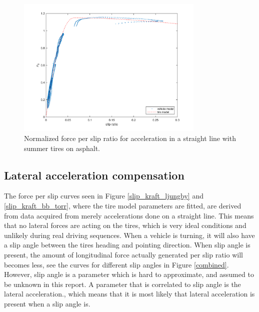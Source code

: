 \begin{figure}[h]
	\centering
	\includegraphics[width=0.8\textwidth]{Pictures/slip_kraft_lk_sport}
	\caption {Normalized force per slip ratio for acceleration in a straight line with summer tires on asphalt.}
	\label{slip_kraft_lk_sport}
\end{figure}

\subsection{Lateral acceleration compensation}
\label{sec:latacccomp}
The force per slip curves seen in Figure \ref{slip_kraft_ljungby} and \ref{slip_kraft_bb_torr}, where the tire model parameters are fitted, are derived from data acquired from merely accelerations done on a straight line. This means that no lateral forces are acting on the tires, which is very ideal conditions and unlikely during real driving sequences. When a vehicle is turning, it will also have a slip angle between the tires heading and pointing direction. When slip angle is present, the amount of longitudinal force actually generated per slip ratio will becomes less, see the curves for different slip angles in Figure \ref{combined}. However, slip angle is a parameter which is hard to approximate, and assumed to be unknown in this report. A parameter that is correlated to slip angle is the lateral acceleration., which means that it is most likely that lateral acceleration is present when a slip angle is. 
 
